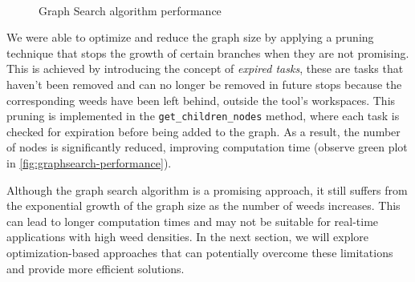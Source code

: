 \begin{figure}[htb]
    \myfloatalign
     \quad
     \\
    \caption{Graph Search algorithm performance}\label{fig:graphsearch-performance}
\end{figure}

We were able to optimize and reduce the graph size by applying a pruning technique that stops the growth of certain branches when they are not promising. This is achieved by introducing the concept of \textit{expired tasks}, these are tasks that haven't been removed and can no longer be removed in future stops because the corresponding weeds have been left behind, outside the tool's workspaces. This pruning is implemented in the \texttt{get\_children\_nodes} method, where each task is checked for expiration before being added to the graph. As a result, the number of nodes is significantly reduced, improving computation time (observe green plot in \autoref{fig:graphsearch-performance}).

Although the graph search algorithm is a promising approach, it still suffers from the exponential growth of the graph size as the number of weeds increases. This can lead to longer computation times and may not be suitable for real-time applications with high weed densities. In the next section, we will explore optimization-based approaches that can potentially overcome these limitations and provide more efficient solutions.

